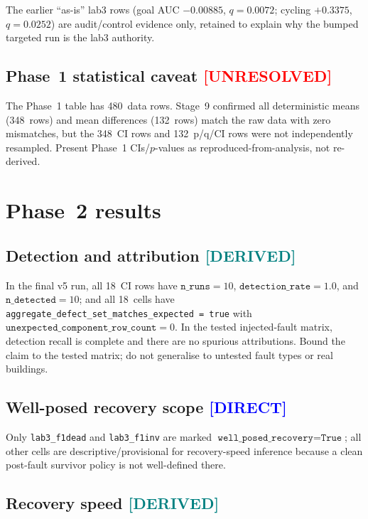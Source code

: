 \documentclass[12pt, a4paper, oneside]{memoir}
\newcommand{\evDirect}{\textcolor{blue}{[DIRECT]}}
\newcommand{\evDerived}{\textcolor{teal}{[DERIVED]}}
\newcommand{\evUnresolved}{\textcolor{red}{[UNRESOLVED]}}
\begin{document}
The earlier \enquote{as-is} lab3 rows (goal AUC $-0.00885$, $q = 0.0072$;
cycling $+0.3375$, $q = 0.0252$) are audit/control evidence only, retained
to explain why the bumped targeted run is the lab3 authority.

\subsection{Phase~1 statistical caveat \evUnresolved}

The Phase~1 table has 480~data rows.  Stage~9 confirmed all deterministic
means (348~rows) and mean differences (132~rows) match the raw data with zero
mismatches, but the 348~CI rows and 132~p/q/CI rows were not independently
resampled.  Present Phase~1 CIs/$p$-values as reproduced-from-analysis, not
re-derived.

\section{Phase~2 results}
\label{sec:eval-phase2}

\subsection{Detection and attribution \evDerived}

In the final v5 run, all 18~CI rows have $\texttt{n\_runs} = 10$,
$\texttt{detection\_rate} = 1.0$, and $\texttt{n\_detected} = 10$; and all
18~cells have \texttt{aggregate\_defect\_set\_matches\_expected = true} with
$\texttt{unexpected\_component\_row\_count} = 0$.  In the tested
injected-fault matrix, detection recall is complete and there are no spurious
attributions.  Bound the claim to the tested matrix; do not generalise to
untested fault types or real buildings.

\subsection{Well-posed recovery scope \evDirect}

Only \texttt{lab3\_f1dead} and \texttt{lab3\_f1inv} are marked
$\texttt{well\_posed\_recovery} = \texttt{True}$; all other cells are
descriptive/provisional for recovery-speed inference because a clean
post-fault survivor policy is not well-defined there.

\subsection{Recovery speed \evDerived}
\end{document}
